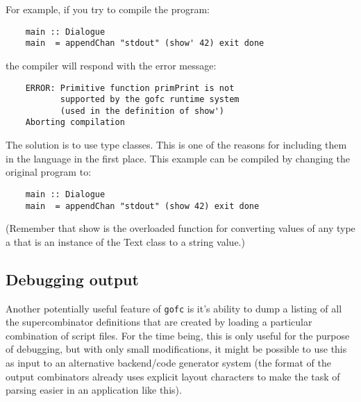 For example, if you try to compile the program:
\begin{verbatim}
    main :: Dialogue
    main  = appendChan "stdout" (show' 42) exit done
\end{verbatim}
the compiler will respond with the error message:
\begin{verbatim}
    ERROR: Primitive function primPrint is not
           supported by the gofc runtime system
           (used in the definition of show')
    Aborting compilation
\end{verbatim}
The solution is to use type classes.  This is one of the reasons for
including them in the language in the first place.  This example can
be compiled by changing the original program to:
\begin{verbatim}
    main :: Dialogue
    main  = appendChan "stdout" (show 42) exit done
\end{verbatim}
(Remember that show is the overloaded function for converting values of
any type a that is an instance of the Text class to a string value.)


\subsection{Debugging output}
Another potentially useful feature of \verb"gofc" is it's ability to dump a
listing of all the supercombinator definitions that are created by
loading a particular combination of script files.  For the time being,
this is only useful for the purpose of debugging, but with only small
modifications, it might be possible to use this as input to an
alternative backend/code generator system (the format of the output
combinators already uses explicit layout characters to make the task of
parsing easier in an application like this).

